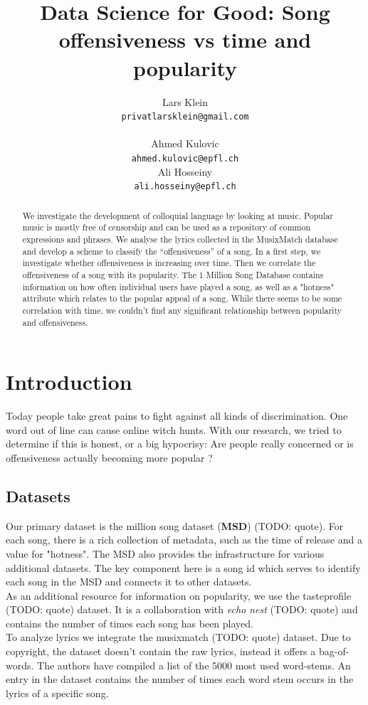 \documentclass[11pt]{article}
\title{Data Science for Good: Song offensiveness vs time and popularity}
\author{Lars Klein \\
  {\tt privatlarsklein@gmail.com} \\\And
  \\Ahmed Kulovic \\
  {\tt ahmed.kulovic@epfl.ch} \\\And
Ali Hosseiny \\
{\tt ali.hosseiny@epfl.ch} \\}
\date{}
\begin{document}
\maketitle
\begin{abstract}
We investigate the development of colloquial language by looking at music. 
Popular music is mostly free of censorship and can be used as a repository of common expressions and phrases. 
We analyse the lyrics collected in the MusixMatch database and develop a scheme to classify the “offensiveness” of a song. 
In a first step, we investigate whether offensiveness is increasing over time. Then we correlate the offensiveness of a song with its popularity. 
The 1 Million Song Database contains information on how often individual users have played a song, as well as a "hotness" attribute which relates to the popular appeal of a song.
While there seems to be some correlation with time, we couldn't find any significant relationship between popularity and offensiveness.
\end{abstract}



\section{Introduction}

Today people take great pains to fight against all kinds of discrimination. 
One word out of line can cause online witch hunts. 
With our research, we tried to determine if this is honest, or a big hypocrisy: 
Are people really concerned or is offensiveness actually becoming more popular ?

\subsection{Datasets}

Our primary dataset is the million song dataset (\textbf{MSD}) (TODO: quote).
For each song, there is a rich collection of metadata, such as the time of release and a value for "hotness".
The MSD also provides the infrastructure for various additional datasets. The key component here is a song id
which serves to identify each song in the MSD and connects it to other datasets.\\
As an additional resource for information on popularity, we use the tasteprofile (TODO: quote) dataset.
It is a collaboration with \textit{echo nest} (TODO: quote) and contains the number of times each song has been played.\\
To analyze lyrics we integrate the musixmatch (TODO: quote) dataset. Due to copyright, the dataset doesn't contain the raw lyrics,
instead it offers a bag-of-words. The authors have compiled a list of the 5000 most used word-stems. An entry in the dataset contains
the number of times each word stem occurs in the lyrics of a specific song.
\end{document}

